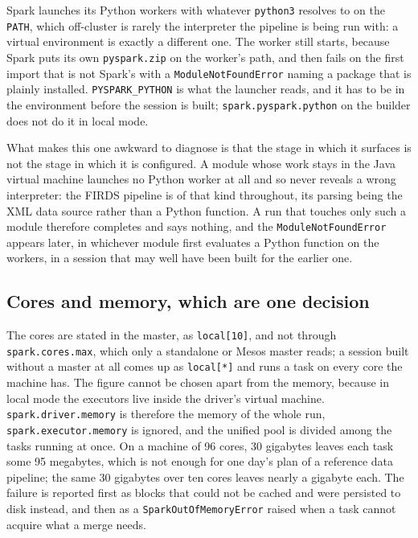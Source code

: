Spark launches its Python workers with whatever \verb|python3| resolves to on the \verb|PATH|, which off-cluster is rarely the interpreter the pipeline is being run with: a virtual environment is exactly a different one. The worker still starts, because Spark puts its own \verb|pyspark.zip| on the worker's path, and then fails on the first import that is not Spark's with a \verb|ModuleNotFoundError| naming a package that is plainly installed. \verb|PYSPARK_PYTHON| is what the launcher reads, and it has to be in the environment before the session is built; \verb|spark.pyspark.python| on the builder does not do it in local mode.

What makes this one awkward to diagnose is that the stage in which it surfaces is not the stage in which it is configured. A module whose work stays in the Java virtual machine launches no Python worker at all and so never reveals a wrong interpreter: the FIRDS pipeline is of that kind throughout, its parsing being the XML data source rather than a Python function. A run that touches only such a module therefore completes and says nothing, and the \verb|ModuleNotFoundError| appears later, in whichever module first evaluates a Python function on the workers, in a session that may well have been built for the earlier one.

\subsection{Cores and memory, which are one decision}

The cores are stated in the master, as \verb|local[10]|, and not through \verb|spark.cores.max|, which only a standalone or Mesos master reads; a session built without a master at all comes up as \verb|local[*]| and runs a task on every core the machine has. The figure cannot be chosen apart from the memory, because in local mode the executors live inside the driver's virtual machine. \verb|spark.driver.memory| is therefore the memory of the whole run, \verb|spark.executor.memory| is ignored, and the unified pool is divided among the tasks running at once. On a machine of 96 cores, 30 gigabytes leaves each task some 95 megabytes, which is not enough for one day's plan of a reference data pipeline; the same 30 gigabytes over ten cores leaves nearly a gigabyte each. The failure is reported first as blocks that could not be cached and were persisted to disk instead, and then as a \verb|SparkOutOfMemoryError| raised when a task cannot acquire what a merge needs.

